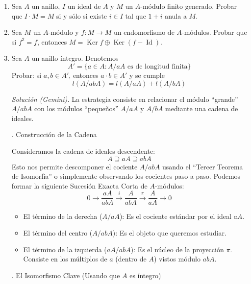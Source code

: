 \begin{enumerate}[1)] 
    \item Sea $A$ un anillo, $I$ un ideal de $A$ y $M$ un $A$-módulo finito generado. Probar que $I \cdot M = M$ si y sólo si existe $i \in I$ tal que $1+i$ anula a $M$.
    \item Sea $M$ un $A$-módulo y $f: M \to M$ un endomorfismo de $A$-módulos. Probar que si $f^2 = f$, entonces $M = \operatorname{Ker} f \oplus \operatorname{Ker}(f - \operatorname{Id})$.
    \item Sea $A$ un anillo íntegro. Denotemos$$A' = \{ a \in A : A/aA \text{ es de longitud finita} \}$$
    Probar: si $a, b \in A'$, entonces $a \cdot b \in A'$ y se cumple$$l(A/abA) = l(A/aA) + l(A/bA)$$
    
    \noindent \textit{Soluci\'on (Gemini).}
    La estrategia consiste en relacionar el módulo ``grande'' $A/abA$ con los módulos ``pequeños'' $A/aA$ y $A/bA$ mediante una cadena de ideales.
    
    . Construcción de la Cadena
    
    Consideramos la cadena de ideales descendente: $$A \supseteq aA \supseteq abA$$ Esto nos permite descomponer el cociente $A/abA$ usando el ``Tercer Teorema de Isomorfía'' o simplemente observando los cocientes paso a paso. Podemos formar la siguiente Sucesión Exacta Corta de $A$-módulos:$$0 \longrightarrow \frac{aA}{abA} \xrightarrow{\; i \;} \frac{A}{abA} \xrightarrow{\; \pi \;} \frac{A}{aA} \longrightarrow 0$$
    \begin{itemize}
        \item El término de la derecha ($A/aA$): Es el cociente estándar por el ideal $aA$.
        \item El término del centro ($A/abA$): Es el objeto que queremos estudiar.
        \item El término de la izquierda ($aA/abA$): Es el núcleo de la proyección $\pi$. Consiste en los múltiplos de $a$ (dentro de $A$) vistos módulo $abA$.
    \end{itemize}
    
     . El Isomorfismo Clave (Usando que $A$ es íntegro) 
    

\end{enumerate}
